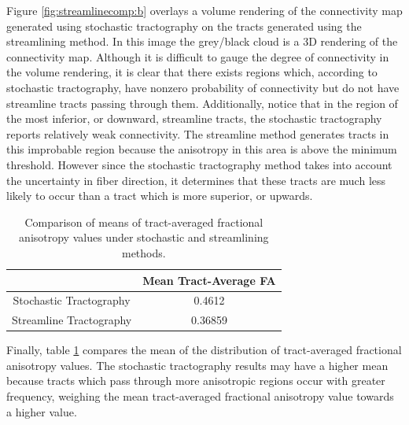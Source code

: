 Figure \ref{fig:streamlinecomp:b} overlays a volume rendering of the connectivity map generated using stochastic tractography on the tracts generated using the streamlining method.  In this image the grey/black cloud is a 3D rendering of the connectivity map.  Although it is difficult to gauge the degree of connectivity in the volume rendering, it is clear that there exists regions which, according to stochastic tractography, have nonzero probability of connectivity but do not have streamline tracts passing through them.  Additionally, notice that in the region of the most inferior, or downward, streamline tracts, the stochastic tractography reports relatively weak connectivity.  The streamline method generates tracts in this improbable region because the anisotropy in this area is above the minimum threshold.  However since the stochastic tractography method takes into account the uncertainty in fiber direction, it determines that these tracts are much less likely to occur than a tract which is more superior, or upwards.

\begin{table} \label{tab:streamlinecomp}
  \center
  \begin{tabular}{cc}
    \hline & Mean Tract-Average FA\\
    \hline Stochastic Tractography & 0.4612\\
    Streamline Tractography & 0.36859\\
    \hline
  \end{tabular}
  \caption{Comparison of means of tract-averaged fractional anisotropy values under stochastic and streamlining methods.}
\end{table}

Finally, table \ref{tab:streamlinecomp} compares the mean of the distribution of tract-averaged fractional anisotropy values.  The stochastic tractography results may have a higher mean because tracts which pass through more anisotropic regions occur with greater frequency, weighing the mean tract-averaged fractional anisotropy value towards a higher value.




